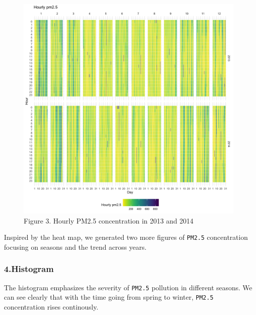 \documentclass[]{article}
\begin{document}
\begin{figure}
\centering
\includegraphics{../images/heatmap.png}
\caption{Figure 3. Hourly PM2.5 concentration in 2013 and 2014}
\end{figure}

Inspired by the heat map, we generated two more figures of
\texttt{PM2.5} concentration focusing on seasons and the trend across
years.

\hypertarget{histogram}{%
\subsubsection{4.Histogram}\label{histogram}}

The histogram emphasizes the severity of \texttt{PM2.5} pollution in
different seasons. We can see clearly that with the time going from
spring to winter, \texttt{PM2.5} concentration rises continously.
\end{document}
